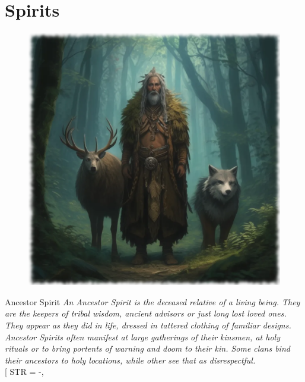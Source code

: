 \section{Spirits}
\label{sec:spirits}

\begin{samepage}

\begin{figure}[H]
\begin{center}
\includegraphics[scale=0.24]{img/ai-images/ancestor-spirit.png}
\end{center}
\end{figure}
\begin{monsterbox}{Ancestor Spirit}
	\textit{An Ancestor Spirit is the deceased relative of a living being. They are the keepers of tribal wisdom, ancient advisors or just long lost loved ones. They appear as they did in life, dressed in tattered clothing of familiar designs. Ancestor Spirits often manifest at large gatherings of their kinsmen, at holy rituals or to bring portents of warning and doom to their kin. Some clans bind their ancestors to holy locations, while other see that as disrespectful.}\\
	\rpghline
	\basics[%
	powerpoints = 17,
	movementrate = 30m,
	plunderrating = 0
	]
	\rpghline%
	\stats[ %
		STR = -,

\end{monsterbox}
\end{samepage}
